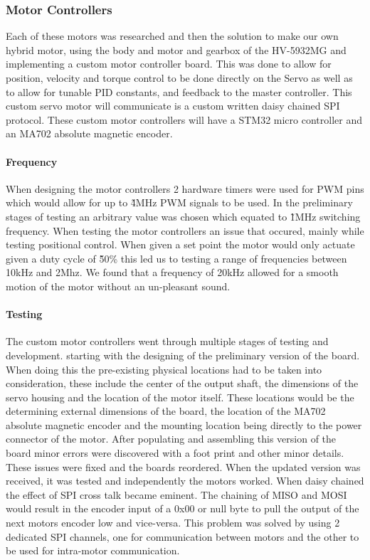         \subsubsection{Motor Controllers}
            Each of these motors was researched and then the solution to make our own hybrid motor, using the body and motor and gearbox of the HV-5932MG and implementing a custom motor controller board. This was done to allow for position, velocity and torque control to be done directly on the Servo as well as to allow for tunable PID constants, and feedback to the master controller. This custom servo motor will communicate is a custom written daisy chained SPI protocol. These custom motor controllers will have a STM32 micro controller and an MA702 absolute magnetic encoder\cite{MA702}.
            \paragraph{Frequency}
                When designing the motor controllers 2 hardware timers were used for PWM pins which would allow for up to \~4MHz PWM signals to be used. In the preliminary stages of testing an arbitrary value was chosen which equated to \~1MHz switching frequency. When testing the motor controllers an issue that occured, mainly while testing positional control. When given a set point the motor would only actuate given a duty cycle of  \~50\% this led us to testing a range of frequencies between 10kHz and 2Mhz. We found that a frequency of 20kHz allowed for a smooth motion of the motor without an un-pleasant sound.  
            \paragraph{Testing} 
                The custom motor controllers went through multiple stages of testing and development. starting with the designing of the preliminary version of the board. When doing this the pre-existing physical locations had to be taken into consideration, these include the center of the output shaft, the dimensions of the servo housing and the location of the motor itself. These locations would be the determining external dimensions of the board, the location of the MA702 absolute magnetic encoder and the mounting location being directly to the power connector of the motor. After populating and assembling this version of the board minor errors were discovered with a foot print and other minor details. These issues were fixed and the boards reordered. When the updated version was received, it was tested and independently the motors worked. When daisy chained the effect of SPI cross talk became eminent. The chaining of MISO and MOSI would result in the encoder input of a 0x00 or null byte to pull the output of the next motors encoder low and vice-versa. This problem was solved by using 2 dedicated SPI channels, one for communication between motors and the other to be used for intra-motor communication. 

